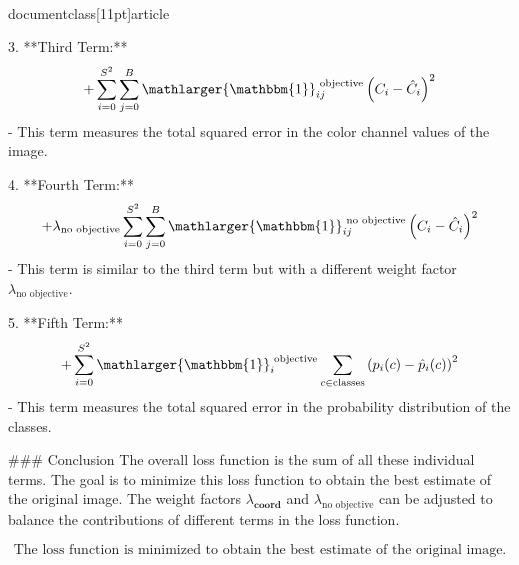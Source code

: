 \\documentclass[11pt]{article}
\begin{document}
3. **Third Term:**
   \[
   + \sum_{i = 0}^{S^2}
    \sum_{j = 0}^{B}
        \mathlarger{\mathbbm{1}}_{ij}^{\text{ objective}}
        \left(
            C_i - \hat{C}_i
        \right)^2
   \]
   - This term measures the total squared error in the color channel values of the image.

4. **Fourth Term:**
   \[
   + \lambda_\textrm{no objective}
   \sum_{i = 0}^{S^2}
    \sum_{j = 0}^{B}
    \mathlarger{\mathbbm{1}}_{ij}^{\text{ no objective}}
        \left(
            C_i - \hat{C}_i
        \right)^2
   \]
   - This term is similar to the third term but with a different weight factor \(\lambda_\textrm{no objective}\).

5. **Fifth Term:**
   \[
   + \sum_{i = 0}^{S^2}
\mathlarger{\mathbbm{1}}_i^{\text{ objective}}
    \sum_{c \in \textrm{classes}}
        \left(
            p_i(c) - \hat{p}_i(c)
        \right)^2
   \]
   - This term measures the total squared error in the probability distribution of the classes.

### Conclusion
The overall loss function is the sum of all these individual terms. The goal is to minimize this loss function to obtain the best estimate of the original image. The weight factors \(\lambda_\textbf{coord}\) and \(\lambda_\textrm{no objective}\) can be adjusted to balance the contributions of different terms in the loss function.

\[
\boxed{\text{The loss function is minimized to obtain the best estimate of the original image.}}
\]
\end{document}
